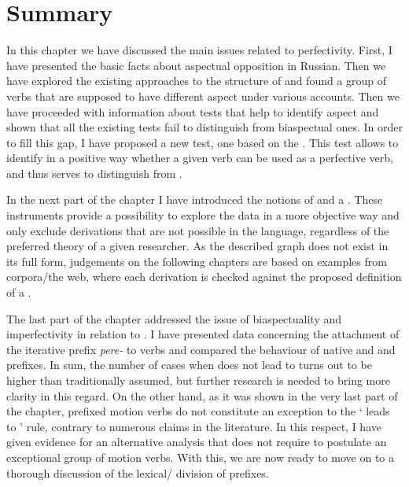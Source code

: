 \section{Summary}
In this chapter we have discussed the main issues related to perfectivity. First, I have presented the basic facts about aspectual opposition in Russian. Then we have explored the existing approaches to the  structure of  and found a group of verbs that are supposed to have different aspect under various accounts. Then we have proceeded with information about tests that help to identify aspect and shown that all the existing tests fail to distinguish  from biaspectual ones. In order to fill this gap, I have proposed a new test, one based on the . This test allows to identify in a positive way whether a given verb can be used as a perfective verb, and thus serves to distinguish  from .

In the next part of the chapter I have introduced the notions of  and a . These instruments provide a possibility to explore the data in a more objective way and only exclude derivations that are not possible in the language, regardless of the preferred theory of a given researcher. As the described graph does not exist in its full form, judgements on the following chapters are based on examples from corpora/the web, where each derivation is checked against the proposed definition of a .

The last part of the chapter addressed the issue of biaspectuality and imperfectivity in relation to . I have presented data concerning the attachment of the iterative prefix \textit{pere-} to  verbs and compared the behaviour of native and   and prefixes. In sum, the number of cases when  does not lead to  turns out to be higher than traditionally assumed, but further research is needed to bring more clarity in this regard. On the other hand, as it was shown in the very last part of the chapter, prefixed motion verbs do not constitute an exception to the ` leads to ' rule, contrary to numerous claims in the literature. In this respect, I have given evidence for an alternative analysis that does not require to postulate an exceptional group of motion verbs. With this, we are now ready to move on to a thorough discussion of the lexical/ division of prefixes.

